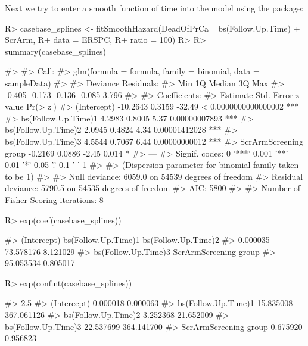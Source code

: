 \documentclass[
]{jss}
\begin{document}
Next we try to enter a smooth function of time into the model using the
 package:

\begin{CodeChunk}

\begin{CodeInput}
R> casebase_splines <- fitSmoothHazard(DeadOfPrCa ~ bs(Follow.Up.Time) + ScrArm, 
R+                                     data = ERSPC, 
R+                                     ratio = 100)
R> 
R> summary(casebase_splines)
\end{CodeInput}

\begin{CodeOutput}
#> 
#> Call:
#> glm(formula = formula, family = binomial, data = sampleData)
#> 
#> Deviance Residuals: 
#>    Min      1Q  Median      3Q     Max  
#> -0.405  -0.173  -0.136  -0.085   3.796  
#> 
#> Coefficients:
#>                       Estimate Std. Error z value             Pr(>|z|)    
#> (Intercept)           -10.2643     0.3159  -32.49 < 0.0000000000000002 ***
#> bs(Follow.Up.Time)1     4.2983     0.8005    5.37        0.00000007893 ***
#> bs(Follow.Up.Time)2     2.0945     0.4824    4.34        0.00001412028 ***
#> bs(Follow.Up.Time)3     4.5544     0.7067    6.44        0.00000000012 ***
#> ScrArmScreening group  -0.2169     0.0886   -2.45                0.014 *  
#> ---
#> Signif. codes:  0 '***' 0.001 '**' 0.01 '*' 0.05 '.' 0.1 ' ' 1
#> 
#> (Dispersion parameter for binomial family taken to be 1)
#> 
#>     Null deviance: 6059.0  on 54539  degrees of freedom
#> Residual deviance: 5790.5  on 54535  degrees of freedom
#> AIC: 5800
#> 
#> Number of Fisher Scoring iterations: 8
\end{CodeOutput}

\begin{CodeInput}
R> exp(coef(casebase_splines))
\end{CodeInput}

\begin{CodeOutput}
#>           (Intercept)   bs(Follow.Up.Time)1   bs(Follow.Up.Time)2 
#>              0.000035             73.578176              8.121029 
#>   bs(Follow.Up.Time)3 ScrArmScreening group 
#>             95.053534              0.805017
\end{CodeOutput}

\begin{CodeInput}
R> exp(confint(casebase_splines))
\end{CodeInput}

\begin{CodeOutput}
#>                           2.5 %
#> (Intercept)            0.000018   0.000063
#> bs(Follow.Up.Time)1   15.835008 367.061126
#> bs(Follow.Up.Time)2    3.252368  21.652009
#> bs(Follow.Up.Time)3   22.537699 364.141700
#> ScrArmScreening group  0.675920   0.956823
\end{CodeOutput}
\end{CodeChunk}
\end{document}
